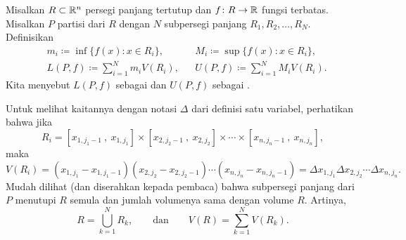\begin{defn}
\begin{myfigureht}
\caption{Contoh partisi persegi panjang di $\R^2$. Urutan subpersegi panjang
tidak penting.\label{mv:figrect}}
\end{myfigureht}

Misalkan $R \subset {\mathbb{R}}^n$ persegi panjang tertutup dan
$f \colon R \to {\mathbb{R}}$ fungsi terbatas. Misalkan $P$ partisi dari $R$ dengan
$N$ subpersegi panjang $R_1,R_2,\ldots,R_N$.
Definisikan
\begin{align*}
& m_i \coloneqq \inf \bigl\{ f(x) : x \in R_i \bigr\} , & 
& M_i \coloneqq \sup \bigl\{ f(x) : x \in R_i \bigr\} , \\
& L(P,f) \coloneqq
\sum_{i=1}^N m_i V(R_i) , &
& U(P,f) \coloneqq
\sum_{i=1}^N M_i V(R_i) .
\end{align*}
Kita menyebut $L(P,f)$ sebagai \emph{} dan
$U(P,f)$ sebagai \emph{}.
\end{defn}

Untuk melihat kaitannya dengan notasi $\Delta$ dari definisi satu variabel,
perhatikan bahwa jika
\begin{equation*}
R_i = [x_{1,j_1-1}~,~ x_{1,j_1}]
\times
[x_{2,j_2-1}~,~ x_{2,j_2}]
\times
\cdots
\times
[x_{n,j_n-1}~,~ x_{n,j_n}] ,
\end{equation*}
maka
\begin{equation*}
V(R_i)
=
(x_{1,j_1}-x_{1,j_1-1})
(x_{2,j_2}-x_{2,j_2-1})
\cdots
(x_{n,j_n}-x_{n,j_n-1})
= 
\Delta x_{1,j_1}
\Delta x_{2,j_2}
\cdots
\Delta x_{n,j_n} .
\end{equation*}
Mudah dilihat (dan diserahkan kepada pembaca) bahwa subpersegi panjang dari $P$
menutupi $R$ semula dan jumlah volumenya sama dengan volume $R$. Artinya,
\begin{equation*}
R= \bigcup_{k=1}^N R_k , \qquad \text{dan} \qquad
V(R) = \sum_{k=1}^N V(R_k).
\end{equation*}

